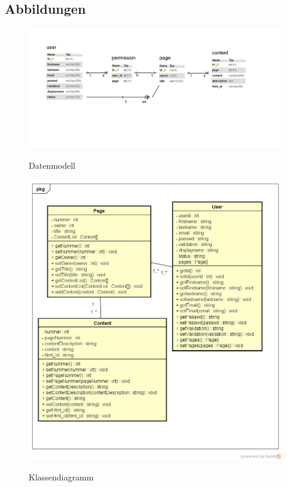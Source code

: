 \documentclass[10pt]{scrarticle}
\begin{document}
\subsection{Abbildungen}



\begin{figure}[h]
\caption{Datenmodell}
\includegraphics[width=\textwidth]{DatenmodellEPortfolio}
\label{fig:datenmodell}
\end{figure}

\begin{figure}[h]
\caption{Klassendiagramm}
\includegraphics[width=\textwidth]{ClassDiagram}
\label{fig:classdiagram}
\end{figure}
\end{document}
